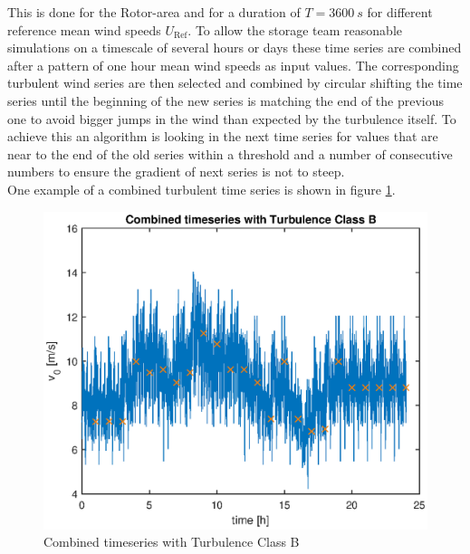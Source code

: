 This is done for the Rotor-area and for a duration of $T = \SI{3600}{s}$ for different reference mean wind speeds $U_{\text{Ref}}$. To allow the storage team reasonable simulations on a timescale of several hours or days these time series are combined after a pattern of one hour mean wind speeds as input values. The corresponding turbulent wind series are then selected and combined by circular shifting the time series until the beginning of the new series is matching the end of the previous one to avoid bigger jumps in the wind than expected by the turbulence itself. To achieve this an algorithm is looking in the next time series for values that are near to the end of the old series within a threshold and a number of consecutive numbers to ensure the gradient of next series is not to steep. \\
One example of a combined turbulent time series is shown in figure \ref{fig:TurbWindField}.
\begin{figure}[tbh]
	\centering	
	\includegraphics[width=12cm]{Figures/TurbWindField.eps}
	\caption{Combined timeseries with Turbulence Class B}
	\label{fig:TurbWindField}
\end{figure}    
